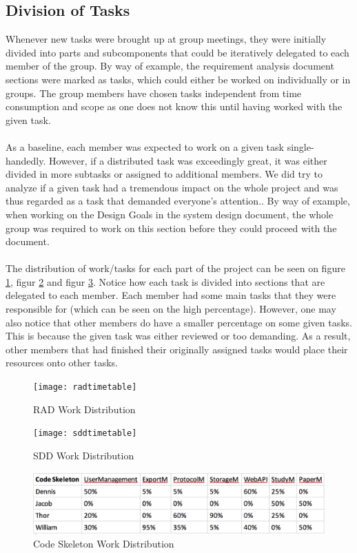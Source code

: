 \subsection{Division of Tasks}
Whenever new tasks were brought up at group meetings, they were initially divided into parts and subcomponents that could be iteratively delegated to each member of the group. By way of example, the requirement analysis document sections were marked as tasks, which could either be worked on individually or in groups. The group members have chosen tasks independent from time consumption and scope as one does not know this until having worked with the given task.
\\\\
As a baseline, each member was expected to work on a given task single-handedly. However, if a distributed task was exceedingly great, it was either divided in more subtasks or assigned to additional members. We did try to analyze if a given task had a tremendous impact on the whole project and was thus regarded as a task that demanded everyone's attention.. By way of example, when working on the Design Goals in the system design document, the whole group was required to work on this section before they could proceed with the document. 
\\\\
The distribution of work/tasks for each part of the project can be seen on figure \ref{fig:rad}, figur \ref{fig:sdd} and figur \ref{fig:codeskeleton}. Notice how each task is divided into sections that are delegated to each member. Each member had some main tasks that they were responsible for (which can be seen on the high percentage). However, one may also notice that other members do have a smaller percentage on some given tasks. This is because the given task was either reviewed or too demanding. As a result, other members that had finished their originally assigned tasks would place their resources onto other tasks.


\begin{figure}[H]
	\centering
	\texttt{[image: radtimetable]}
	\caption{RAD Work Distribution}
	\label{fig:rad}
\end{figure}

\begin{figure}[H]
	\centering
	\texttt{[image: sddtimetable]}
	\caption{SDD Work Distribution}
	\label{fig:sdd}
\end{figure}

\begin{figure}[H]
	\centering
	\includegraphics[width=150mm]{image/skeletontimetable}
	\caption{Code Skeleton Work Distribution}
	\label{fig:codeskeleton} %
\end{figure}
